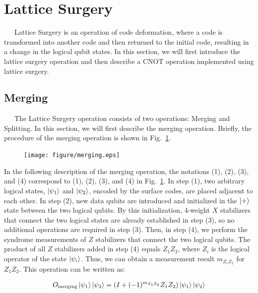 \documentclass[a4paper,11pt]{ltjsarticle}
\begin{document}
\section{Lattice Surgery}{
    \ \ \ Lattice Surgery \cite{horsman2012} is an operation of code deformation, where a code is transformed into another code and then returned to the initial code, resulting in a change in the logical qubit states. In this section, we will first introduce the lattice surgery operation and then describe a CNOT operation implemented using lattice surgery.

    \subsection{Merging}
    \ \ \ The Lattice Surgery operation consists of two operations: Merging and Splitting. In this section, we will first describe the merging operation. Briefly, the procedure of the merging operation is shown in Fig.~\ref{merging}.
    \begin{figure}[h]
        \centering
        \texttt{[image: figure/merging.eps]}
        \vspace{0pt}\caption{}
        \label{merging}
        \vspace{-10pt}
    \end{figure}

    In the following description of the merging operation, the notations (1), (2), (3), and (4) correspond to (1), (2), (3), and (4) in Fig.~\ref{merging}. In step (1), two arbitrary logical states, $\ket{\psi_1}$ and $\ket{\psi_2}$, encoded by the surface codes, are placed adjacent to each other. In step (2), new data qubits are introduced and initialized in the $\ket{+}$ state between the two logical qubits. By this initialization, 4-weight $X$ stabilizers that connect the two logical states are already established in step (3), so no additional operations are required in step (3). Then, in step (4), we perform the syndrome measurements of $Z$ stabilizers that connect the two logical qubits. The product of all $Z$ stabilizers added in step (4) equals $Z_1Z_2$, where $Z_i$ is the logical operator of the state $\ket{\psi_i}$. Thus, we can obtain a measurement result $m_{Z_1Z_2}$ for $Z_1Z_2$. This operation can be written as:

    \begin{align}
        O_\text{merging}\ket{\psi_1}\ket{\psi_2}=\left(I+(-1)^{m_{Z_1Z_2}}Z_1Z_2\right)\ket{\psi_1}\ket{\psi_2}
    \end{align}

}
\end{document}
